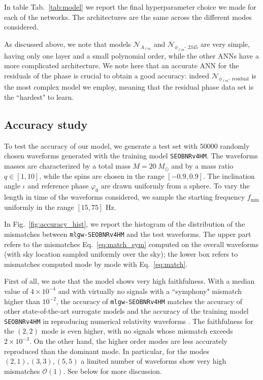 \documentclass[twocolumn,showpacs,preprintnumbers,nofootinbib,prd,
superscriptaddress,10pt]{revtex4-2}
\begin{document}
In table Tab.~\ref{tab:model} we report the final hyperparameter choice we made for each of the networks. The architectures are the same across the different modes considered.

As discussed above, we note that models $\mathcal{N}_{A_{\ell m}}$ and $\mathcal{N}_{\phi_{\ell m}\text{- 2345}}$ are very simple, having only one layer and a small polynomial order, while the other ANNs have a more complicated architecture.
We note here that an accurate ANN for the residuals of the phase is crucial to obtain a good accuracy: indeed $\mathcal{N}_{\phi_{\ell m}\text{- residual}}$ is the most complex model we employ, meaning that the residual phase data set is the ``hardest" to learn.

\subsection{Accuracy study}\label{sec:accuracy}

To test the accuracy of our model, we generate a test set with $50000$ randomly chosen waveforms generated with the training model \texttt{SEOBNRv4HM}.
The waveforms masses are characterized by a total mass $M = \SI{20}{M_\odot}$ and by a mass ratio $q \in [1, 10]$, while the spins are chosen in the range $[-0.9, 0.9]$. The inclination angle $\iota$ and reference phase $\varphi_0$ are drawn uniformly from a sphere.
To vary the length in time of the waveforms considered, we sample the starting frequency $f_\textrm{min}$ uniformly in the range $[15, 75]$ Hz.

In Fig.~\ref{fig:accuracy_hist}, we report the histogram of the distribution of the mismatches between \texttt{mlgw-SEOBNRv4HM} and the test waveforms. The upper part refers to the mismatches Eq.~\eqref{eq:match_sym} computed on the overall waveforms (with sky location sampled uniformly over the sky); the lower box refers to mismatches computed mode by mode with Eq.~\eqref{eq:match}.

First of all, we note that the model shows very high faithfulness. With a median value of $4\times 10^{-4}$ and with virtually no signals with a 
``symphony" mismatch higher than $10^{-2}$, the accuracy of \texttt{mlgw-SEOBNRv4HM} matches the accuracy of other state-of-the-art surrogate models \cite{Cotesta:2020qhw, Khan:2020fso, Gadre:2022sed} and the accuracy of the training model \texttt{SEOBNRv4HM} in reproducing numerical relativity waveforms \cite{Cotesta:2018fcv}.
The faithfulness for the $(2,2)$ mode is even higher, with no signals whose mismatch exceeds $2\times 10^{-3}$.
On the other hand, the higher order modes are less accurately reproduced than the dominant mode. In particular, for the modes $(2,1), (3,3), (5,5)$ a limited number of waveforms show very high mismatches $\mathcal{O}(1)$. See below for more discussion.
\end{document}
